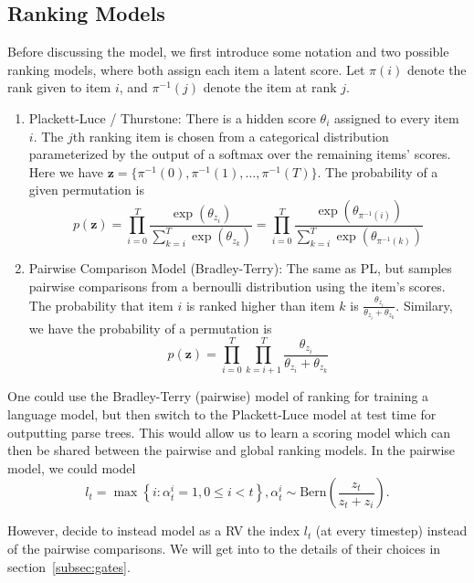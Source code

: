 \documentclass{article}
\newcommand\set[1]{\left\{#1\right\}}
\newcommand\Bern{\mathrm{Bern}}
\newcommand{\bz}{\mathbf{z}}
\begin{document}
\subsection{Ranking Models}
Before discussing the \citet{shen2018prpn} model, we first introduce
some notation and two possible ranking models, where both assign each item a latent score.
Let $\pi(i)$ denote the rank given to item $i$, and $\pi^{-1}(j)$ denote the 
item at rank $j$.
\begin{enumerate}
\item Plackett-Luce / Thurstone:
There is a hidden score $\theta_i$ assigned to every item $i$.
The $j$th ranking item is chosen from a categorical distribution 
parameterized by the output of a softmax over the remaining items' scores.
Here we have $\bz = \{\pi^{-1}(0),\pi^{-1}(1),\ldots,\pi^{-1}(T)\}$.
The probability of a given permutation is
$$
p(\bz)
= \prod_{i=0}^T\frac{\exp(\theta_{z_i})}{\sum_{k=i}^T \exp(\theta_{z_k})}
= \prod_{i=0}^T\frac{\exp(\theta_{\pi^{-1}(i)})}{\sum_{k=i}^T \exp(\theta_{\pi^{-1}(k)})}
$$
\item Pairwise Comparison Model (Bradley-Terry):
The same as PL, but samples pairwise comparisons from a bernoulli distribution
using the item's scores.
The probability that item $i$ is ranked higher than item $k$ is 
$\frac{\theta_{z_i}}{\theta_{z_i}+\theta_{z_k}}$.
Similary, we have the probability of a permutation is
$$
p(\bz) 
= \prod_{i=0}^T\prod_{k=i+1}^T\frac{\theta_{z_i}}{\theta_{z_i}+\theta_{z_k}}
$$
\end{enumerate}
One could use the Bradley-Terry (pairwise)
model of ranking for training a language model,
but then switch to the Plackett-Luce model at test time for outputting parse trees.
This would allow us to learn a scoring model which can then be shared between the 
pairwise and global ranking models.
In the pairwise model, we could model
$$l_t = \max \set{i : \alpha_t^i = 1, 0\leq i<t},
\alpha_t^i \sim \Bern\left(\frac{z_t}{z_t+z_i}\right).$$

However, \citet{shen2018prpn} decide to instead
model as a RV the index $l_t$ (at every timestep) instead of the pairwise comparisons.
We will get into to the details of their choices in section~\ref{subsec:gates}.
\end{document}
